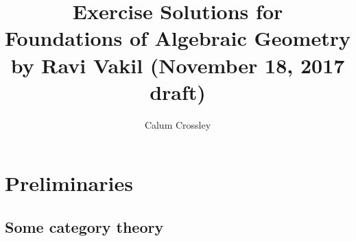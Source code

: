 \documentclass{report}
\title{
    Exercise Solutions for \\
    Foundations of Algebraic Geometry \\
    by Ravi Vakil (November 18, 2017 draft)
}
\author{Calum Crossley}
\date{}
\begin{document}




\maketitle

\part{Preliminaries}

\chapter{Some category theory}
\end{document}
